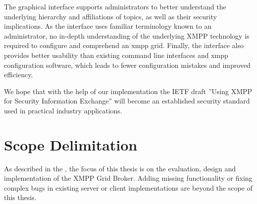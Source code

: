 The graphical interface supports administrators to better understand the underlying hierarchy and affiliations of \glspl{topic}, as well as their security implications.
As the interface uses familiar terminology known to an administrator, no in-depth understanding of the underlying XMPP technology is required to configure and comprehend an \gls{xmpp} grid.
Finally, the interface also provides better usability than existing command line interfaces and \gls{xmpp} configuration software, which leads to fewer configuration mistakes and improved efficiency.

We hope that with the help of our implementation the IETF draft ''Using XMPP for Security Information Exchange'' will become an established security standard used in practical industry applications.

\section{Scope Delimitation} %
As described in the , the focus of this thesis is on the evaluation, design and implementation of the XMPP Grid Broker.
Adding missing functionality or fixing complex bugs in existing server or client implementations are beyond the scope of this thesis.
